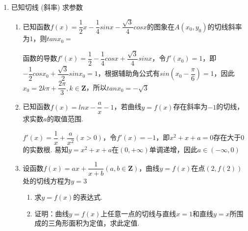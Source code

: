 \begin{enumerate}
    \item 已知切线 (斜率) 求参数
    \begin{enumerate}
        \item 已知函数$f(x) = \dfrac{1}{2}x - \dfrac{1}{4}sinx-\dfrac{\sqrt{3}}{4}cosx$的图象在$A(x_0, y_0)$的切线斜率为$1$，则$tanx_0 = $
        \begin{jieda}
            函数的导数$f'(x) = \dfrac{1}{2}-\dfrac{1}{4}cosx+\dfrac{\sqrt{3}}{4}sinx$，令$f'(x_0) = 1$，即$-\dfrac{1}{2}cosx_0 + \dfrac{\sqrt{3}}{2}sinx_0 = 1$，根据辅助角公式有$sin\left(x_0 - \dfrac{\pi}{6}\right) = 1$，因此$x_0 = 2k\pi + \dfrac{2\pi}{3}, k \in \mathbf{Z}$，所以$tanx_0 = -\sqrt{3}$
        \end{jieda}
        \item 已知函数$f(x) = lnx - \dfrac{a}{x} - 1$，若曲线$y = f(x)$存在斜率为$-1$的切线，求实数$a$的取值范围.
        \begin{jieda}
            $f'(x) = \dfrac{1}{x} + \dfrac{a}{x^2} (x > 0)$，令$f'(x) = -1$，即$x^2+x+a = 0$存在大于$0$的实数根. 易知$y = x^2+x+a$在$(0, +\infty)$单调递增，因此$a \in (-\infty, 0)$
        \end{jieda}
        \item 设函数$f(x) = ax+\dfrac{1}{x+b}(a, b \in \mathbf{Z})$，曲线$y = f(x)$在点$(2, f(2))$处的切线方程为$y = 3$
        \begin{enumerate}
            \item 求$y = f(x)$的表达式.
            \item 证明：曲线$y = f(x)$上任意一点的切线与直线$x = 1$和直线$y = x$所围成的三角形面积为定值，求此定值.
        \end{enumerate}
        \begin{jieda}
\end{jieda}
\end{enumerate}
\end{enumerate}
